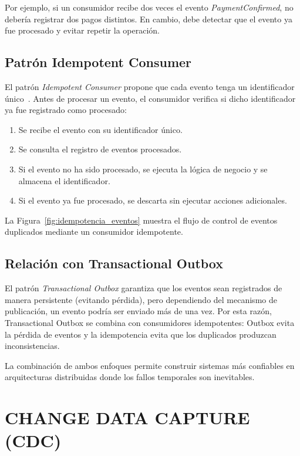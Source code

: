 Por ejemplo, si un consumidor recibe dos veces el evento \textit{PaymentConfirmed}, no debería registrar dos pagos distintos. En cambio, debe detectar que el evento ya fue procesado y evitar repetir la operación.

\subsection{Patrón Idempotent Consumer}

El patrón \textit{Idempotent Consumer} propone que cada evento tenga un identificador único~\parencite{richardson2018}. Antes de procesar un evento, el consumidor verifica si dicho identificador ya fue registrado como procesado:

\begin{enumerate}
    \item Se recibe el evento con su identificador único.
    \item Se consulta el registro de eventos procesados.
    \item Si el evento no ha sido procesado, se ejecuta la lógica de negocio y se almacena el identificador.
    \item Si el evento ya fue procesado, se descarta sin ejecutar acciones adicionales.
\end{enumerate}

La Figura~\ref{fig:idempotencia_eventos} muestra el flujo de control de eventos duplicados mediante un consumidor idempotente.



\subsection{Relación con Transactional Outbox}

El patrón \textit{Transactional Outbox} garantiza que los eventos sean registrados de manera persistente (evitando pérdida), pero dependiendo del mecanismo de publicación, un evento podría ser enviado más de una vez. Por esta razón, Transactional Outbox se combina con consumidores idempotentes: Outbox evita la pérdida de eventos y la idempotencia evita que los duplicados produzcan inconsistencias.

La combinación de ambos enfoques permite construir sistemas más confiables en arquitecturas distribuidas donde los fallos temporales son inevitables.

\section{CHANGE DATA CAPTURE (CDC)}

